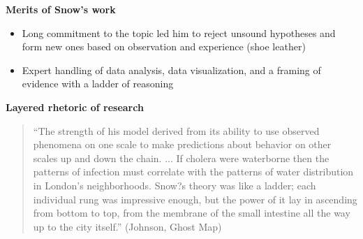 \documentclass[notes=show]{beamer}
\begin{document}
\begin{frame}[plain]
\begin{center}
\textbf{Merits of Snow's work}
\end{center}

\begin{itemize}
\item Long commitment to the topic led him to reject unsound hypotheses and form new ones based on observation and experience (shoe leather)
\item Expert handling of data analysis, data visualization, and a framing of evidence with a ladder of reasoning
\end{itemize}

\end{frame}




\begin{frame}[plain]
\begin{center}
\textbf{Layered rhetoric of research}
\end{center}

\begin{quote}
``The strength of his model derived from its ability to use observed phenomena on one scale to make predictions about behavior on other scales up and down the chain. ... If cholera were waterborne then the patterns of infection must correlate with the patterns of water distribution in London's neighborhoods. Snow?s theory was like a ladder; each individual rung was impressive enough, but the power of it lay in ascending from bottom to top, from the membrane of the small intestine all the way up to the city itself.'' (Johnson, Ghost Map)
\end{quote}

\end{frame}
\end{document}
